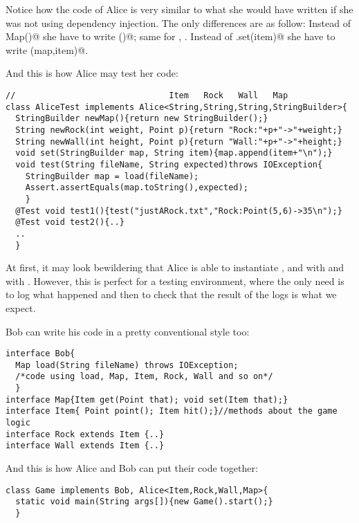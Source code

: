 \documentclass[submission,copyright,creativecommons]{eptcs}
\begin{document}
Notice how the code of Alice is very similar to what she would have written
if she was not using dependency injection. The
only differences are as follow:
Instead of \Q@new Map()@ she have to write \Q@newMap()@; same for
\Q@Rock@, \Q@Wall@.
Instead of \Q@map.set(item)@ she have to write \Q@set(map,item)@.

And this is how Alice may test her code:
\begin{lstlisting}
//                               Item   Rock   Wall   Map
class AliceTest implements Alice<String,String,String,StringBuilder>{
  StringBuilder newMap(){return new StringBuilder();}
  String newRock(int weight, Point p){return "Rock:"+p+"->"+weight;}
  String newWall(int height, Point p){return "Wall:"+p+"->"+height;}
  void set(StringBuilder map, String item){map.append(item+"\n");}
  void test(String fileName, String expected)throws IOException{
    StringBuilder map = load(fileName);
    Assert.assertEquals(map.toString(),expected);
    }
  @Test void test1(){test("justARock.txt","Rock:Point(5,6)->35\n");}
  @Test void test2(){..}
  ..
  }
\end{lstlisting}
At first, it may look bewildering that Alice is able to instantiate
\Q@Item@, \Q@Rock@ and \Q@Wall@ with \Q@String@ and \Q@Map@ with
\Q@StringBuilder@. However, this is perfect for a testing environment, where
the only need is to log what happened and then to check that the result
of the logs is what we expect.

Bob can write his code in a pretty conventional style too:
\begin{lstlisting}
interface Bob{
  Map load(String fileName) throws IOException;
  /*code using load, Map, Item, Rock, Wall and so on*/
  }
interface Map{Item get(Point that); void set(Item that);}
interface Item{ Point point(); Item hit();}//methods about the game logic
interface Rock extends Item {..}
interface Wall extends Item {..}
\end{lstlisting}
And this is how Alice and Bob can put their code together:

\begin{lstlisting}
class Game implements Bob, Alice<Item,Rock,Wall,Map>{
  static void main(String args[]){new Game().start();}
  }
\end{lstlisting}
\end{document}
